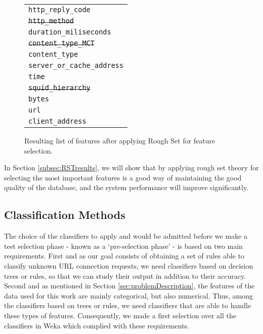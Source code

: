 \documentclass{llncs}
\begin{document}
\begin{figure}[htb]
\centering
\begin{tabular}{ p{6cm} }
  \texttt{http\_reply\_code} \\
  \texttt{\st{http\_method}} \\
  \texttt{duration\_miliseconds} \\
  \texttt{\st{content\_type\_MCT}} \\
  \texttt{content\_type} \\
  \texttt{server\_or\_cache\_address} \\
  \texttt{time} \\
  \texttt{\st{squid\_hierarchy}} \\
  \texttt{bytes} \\
  \texttt{url} \\
  \texttt{client\_address} \\
\end{tabular}
\caption{Resulting list of features after applying Rough Set for feature selection.\label{fig:data_9features}}
\end{figure}

In Section \ref{subsec:RSTresults}, we will show that by applying rough set theory for selecting the most important features is a good way of maintaining the good quality of the database, and the system performance will improve significantly.

%
\subsection{Classification Methods}
\label{subsec:methods}

\noindent The choice of the classifiers to apply and would be admitted before we make a test selection phase - known as a `pre-selection phase' - is based on two main requirements. First and as our goal consists of obtaining a set of rules able to classify unknown URL connection requests,  we need classifiers based on decision trees or rules, so that we can study their output in addition to their accuracy. Second and as mentioned in Section \ref{sec:problemDescription}, the features of the data used for this work are mainly categorical, but also numerical. Thus, among the classifiers based on trees or rules, we need classifiers that are able to handle these types of features. Consequently, we made a first selection over all the classifiers in Weka which complied with these requirements.
\end{document}
